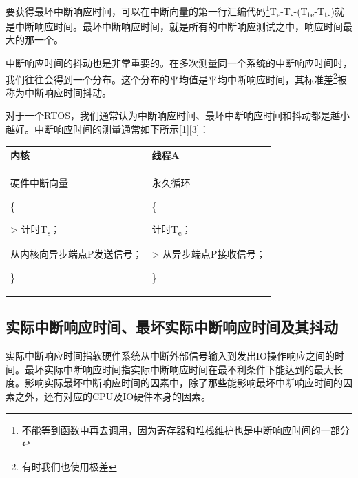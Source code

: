 要获得最坏中断响应时间，可以在中断向量的第一行汇编代码\footnote{不能等到函数中再去调用，因为寄存器和堆栈维护也是中断响应时间的一部分}T\textsubscript{e}-T\textsubscript{s}-(T\textsubscript{te}-T\textsubscript{ts})就是中断响应时间。最坏中断响应时间，就是所有的中断响应测试之中，响应时间最大的那一个。

中断响应时间的抖动也是非常重要的。在多次测量同一个系统的中断响应时间时，我们往往会得到一个分布。这个分布的平均值是平均中断响应时间，其标准差\footnote{有时我们也使用极差}被称为中断响应时间抖动。

对于一个RTOS，我们通常认为中断响应时间、最坏中断响应时间和抖动都是越小越好。中断响应时间的测量通常如下所示\hyperref[sec:chapter-bibliography-2]{{[}1{]}{[}3{]}}：

\label{tab:interrupt-response-time}

{\def\LTcaptype{none} %
\begin{longtable}[]{@{}
  >{\raggedright\arraybackslash}p{}
  >{\raggedright\arraybackslash}p{}@{}}
\toprule\noalign{}
\begin{minipage}[b]{\linewidth}\raggedright
内核
\end{minipage} & \begin{minipage}[b]{\linewidth}\raggedright
线程A
\end{minipage} \\
\midrule\noalign{}
\endhead
\bottomrule\noalign{}
\endlastfoot
硬件中断向量

\{

\textgreater{} 计时T\textsubscript{s}；

从内核向异步端点P发送信号；

\} & 永久循环

\{

计时T\textsubscript{e}；

\textgreater{} 从异步端点P接收信号；

\} \\
\end{longtable}
}

\subsection{实际中断响应时间、最坏实际中断响应时间及其抖动}\label{subsec:realistic-interrupt-response-time-worst-case-and-jitter}

实际中断响应时间指软硬件系统从中断外部信号输入到发出IO操作响应之间的时间。最坏实际中断响应时间指实际中断响应时间在最不利条件下能达到的最大长度。影响实际最坏中断响应时间的因素中，除了那些能影响最坏中断响应时间的因素之外，还有对应的CPU及IO硬件本身的因素。

